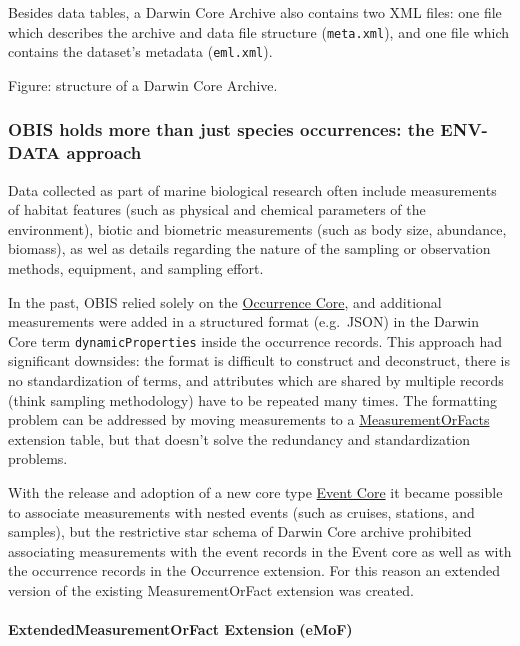\documentclass[
  letterpaper,
  DIV=11,
  numbers=noendperiod,
  oneside]{scrreprt}
\let\oldparagraph\paragraph
\renewcommand{\paragraph}[1]{\oldparagraph{#1}\mbox{}}
\begin{document}
Besides data tables, a Darwin Core Archive also contains two XML files:
one file which describes the archive and data file structure
(\texttt{meta.xml}), and one file which contains the dataset's metadata
(\texttt{eml.xml}).

Figure: structure of a Darwin Core Archive.

\hypertarget{obis-holds-more-than-just-species-occurrences-the-env-data-approach}{%
\subsubsection{OBIS holds more than just species occurrences: the
ENV-DATA
approach}\label{obis-holds-more-than-just-species-occurrences-the-env-data-approach}}

Data collected as part of marine biological research often include
measurements of habitat features (such as physical and chemical
parameters of the environment), biotic and biometric measurements (such
as body size, abundance, biomass), as wel as details regarding the
nature of the sampling or observation methods, equipment, and sampling
effort.

In the past, OBIS relied solely on the
\href{http://rs.gbif.org/core/dwc_occurrence_2015-07-02.xml}{Occurrence
Core}, and additional measurements were added in a structured format
(e.g.~JSON) in the Darwin Core term \texttt{dynamicProperties} inside
the occurrence records. This approach had significant downsides: the
format is difficult to construct and deconstruct, there is no
standardization of terms, and attributes which are shared by multiple
records (think sampling methodology) have to be repeated many times. The
formatting problem can be addressed by moving measurements to a
\href{http://rs.gbif.org/extension/dwc/measurements_or_facts.xml}{MeasurementOrFacts}
extension table, but that doesn't solve the redundancy and
standardization problems.

With the release and adoption of a new core type
\href{http://rs.gbif.org/core/dwc_event_2015_05_29.xml}{Event Core} it
became possible to associate measurements with nested events (such as
cruises, stations, and samples), but the restrictive star schema of
Darwin Core archive prohibited associating measurements with the event
records in the Event core as well as with the occurrence records in the
Occurrence extension. For this reason an extended version of the
existing MeasurementOrFact extension was created.

\hypertarget{extendedmeasurementorfact-extension-emof}{%
\paragraph{ExtendedMeasurementOrFact Extension
(eMoF)}\label{extendedmeasurementorfact-extension-emof}}
\end{document}
